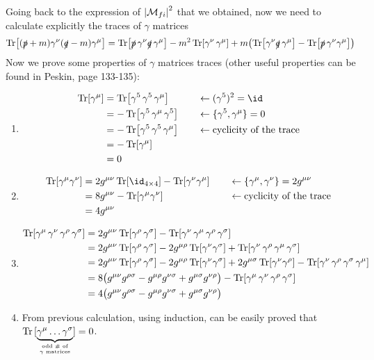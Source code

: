 \documentclass[TheoreticalPhy_ModB.tex]{subfiles}
\begin{document}
\skipline
Going back to the expression of $\abs{\mathcal{M}_{fi}}^2$ that we obtained, now we need to calculate explicitly the traces of $\gamma$ matrices
\[
\Tr \bigl[ (\slashed p + m) \gamma^{\nu} (\slashed q - m) \gamma^{\mu} \bigr] =
\Tr \bigl[ \slashed p \, \gamma^{\nu} \slashed q \, \gamma^{\mu} \bigr] - m^2 \Tr [\gamma^{\nu} \, \gamma^{\mu} ] +
m \bigl( \Tr [\gamma^{\nu} \slashed q \, \gamma^{\mu} ] - \Tr [ \slashed p \, \gamma^{\nu} \gamma^{\mu}] \bigr)
\]
Now we prove some properties of $\gamma$ matrices traces ({other useful properties can be found in Peskin, page 133-135}):
\begin{enumerate}[label=(\Roman*)]
\item 
	\begin{alignat*}{2}
	\Tr [\gamma^{\mu}] 	& = \Tr[\gamma^5 \, \gamma^5 \, \gamma^{\mu} ]		&\quad & \leftarrow (\gamma^5)^2 = \id \\
						& = - \Tr [ \gamma^5 \, \gamma^{\mu} \, \gamma^5 ]	&& \leftarrow \{ \gamma^5, \gamma^{\mu} \} = 0 \\
						& = - \Tr [ \gamma^5 \, \gamma^5 \, \gamma^{\mu} ] 	&& \leftarrow \textup{cyclicity of the trace} \\
						& = -\Tr[\gamma^{\mu}] 							&& \\
						& = 0						&&						
	\end{alignat*}
\item
	\[\begin{aligned}
		\Tr[\gamma^\mu\gamma^\nu] &= 2g^{\mu\nu}\Tr[\id_{4\times4}] - \Tr[\gamma^\nu\gamma^\mu] \quad&&\leftarrow\{\gamma^\mu,\gamma^\nu\}=2g^{\mu\nu}\\
		&=8g^{\mu\nu}-\Tr[\gamma^\mu\gamma^\nu]\quad&&\leftarrow \textup{cyclicity of the trace}\\
		& = 4g^{\mu\nu}
	\end{aligned}\]
\item
	\begin{align*}
	\Tr [\gamma^{\mu} \, \gamma^{\nu} \, \gamma^{\rho} \, \gamma^{\sigma}]
	&= 2g^{\mu\nu}\Tr [\gamma^{\rho}\, \gamma^{\sigma}] - \Tr[\gamma^{\nu}\, \gamma^{\mu}\, \gamma^{\rho}\, \gamma^{\sigma} ] \\
	& = 2g^{\mu\nu}\Tr [\gamma^{\rho}\, \gamma^{\sigma}] - 2g^{\mu\rho}\Tr[\gamma^{\nu}\gamma^{\sigma}]
		 +\Tr[\gamma^{\nu}\, \gamma^{\rho}\, \gamma^{\mu}\, \gamma^{\sigma}] \\
	&= 2g^{\mu\nu}\Tr [\gamma^{\rho}\, \gamma^{\sigma}] - 2g^{\mu\rho}\Tr[\gamma^{\nu}\gamma^{\sigma}] +2g^{\mu\sigma}\Tr[\gamma^\nu\gamma^\rho]-\Tr[\gamma^{\nu}\, \gamma^{\rho}\, \gamma^{\sigma}\, \gamma^{\mu}]\\
	& = 8 \bigl( g^{\mu\nu}g^{\rho\sigma} - g^{\mu\rho}g^{\nu\sigma} + g^{\mu\sigma}g^{\nu\rho} \bigr)
		-\Tr[\gamma^{\mu}\, \gamma^{\nu}\, \gamma^{\rho}\, \gamma^{\sigma}] \\
	& =
		4\bigl( g^{\mu\nu}g^{\rho\sigma} - g^{\mu\rho}g^{\nu\sigma} + g^{\mu\sigma}g^{\nu\rho} \bigr)
	\end{align*}
\item From previous calculation, using induction, can be easily proved that $\Tr \,[\underbrace{\gamma^{\mu} \dots \gamma^{\sigma}}_{\textup{odd \# of} \atop \gamma \textup{ matrices}}] = 0$.


\end{enumerate}
\end{document}
